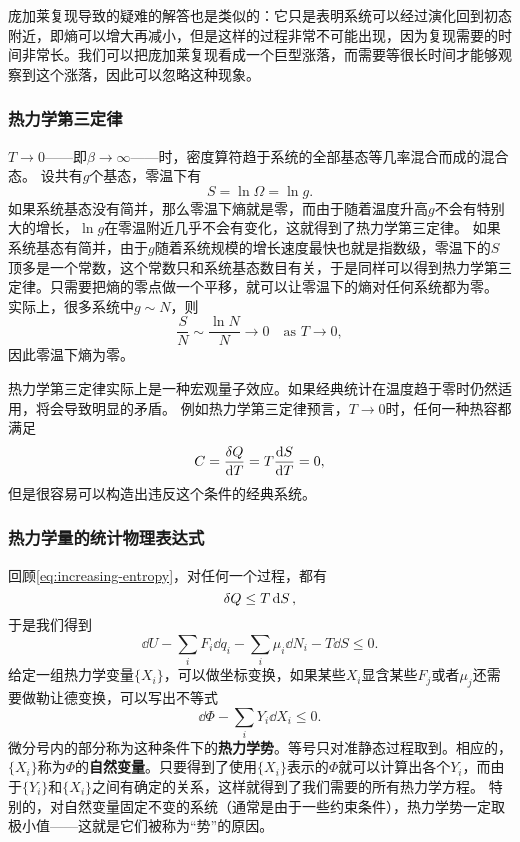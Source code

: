 \documentclass[hyperref, UTF8, a4paper]{ctexart}
\begin{document}
庞加莱复现导致的疑难的解答也是类似的：它只是表明系统可以经过演化回到初态附近，即熵可以增大再减小，但是这样的过程非常不可能出现，因为复现需要的时间非常长。我们可以把庞加莱复现看成一个巨型涨落，而需要等很长时间才能够观察到这个涨落，因此可以忽略这种现象。

\subsubsection{热力学第三定律}

$T\to 0$——即$\beta \to \infty$——时，密度算符趋于系统的全部基态等几率混合而成的混合态。
设共有$g$个基态，零温下有
\[
    S = \ln \Omega = \ln g.
\]
如果系统基态没有简并，那么零温下熵就是零，而由于随着温度升高$g$不会有特别大的增长，$\ln g$在零温附近几乎不会有变化，这就得到了热力学第三定律。
如果系统基态有简并，由于$g$随着系统规模的增长速度最快也就是指数级，零温下的$S$顶多是一个常数，这个常数只和系统基态数目有关，于是同样可以得到热力学第三定律。只需要把熵的零点做一个平移，就可以让零温下的熵对任何系统都为零。
实际上，很多系统中$g \sim N$，则
\[
    \frac{S}{N} \sim \frac{\ln N}{N} \to 0 \quad \text{as } T \to 0,
\]
因此零温下熵为零。

热力学第三定律实际上是一种宏观量子效应。如果经典统计在温度趋于零时仍然适用，将会导致明显的矛盾。
例如热力学第三定律预言，$T\to 0$时，任何一种热容都满足
\[
    C = \frac{\var{Q}}{\dd{T}} = T \frac{\dd{S}}{\dd{T}} = 0,
\]
但是很容易可以构造出违反这个条件的经典系统。

\subsubsection{热力学量的统计物理表达式}

回顾\eqref{eq:increasing-entropy}，对任何一个过程，都有
\[
    \var{Q} \leq T \dd{S},
\]
于是我们得到
\begin{equation}
    \dd{U} - \sum_i F_i \dd{q_i} - \sum_i \mu_i \dd{N_i} - T \dd{S} \leq 0.
\end{equation}
给定一组热力学变量$\{X_i\}$，可以做坐标变换，如果某些$X_i$显含某些$F_j$或者$\mu_j$还需要做勒让德变换，可以写出不等式
\[
    \dd{\Phi} - \sum_i Y_i \dd{X_i} \leq 0.
\]
微分号内的部分称为这种条件下的\textbf{热力学势}。等号只对准静态过程取到。相应的，$\{X_i\}$称为$\Phi$的\textbf{自然变量}。只要得到了使用$\{X_i\}$表示的$\Phi$就可以计算出各个$Y_i$，而由于$\{Y_i\}$和$\{X_i\}$之间有确定的关系，这样就得到了我们需要的所有热力学方程。
特别的，对自然变量固定不变的系统（通常是由于一些约束条件），热力学势一定取极小值——这就是它们被称为“势”的原因。
\end{document}
